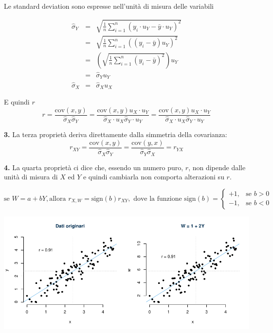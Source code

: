 \documentclass[
  11pt,
]{book}
\theoremstyle{mytheoremstyle}
\theoremstyle{mydefstyle}
\begin{document}
Le standard deviation sono espresse nell'unità di misura delle variabili

\begin{eqnarray*}
\hat\sigma_Y &=& \sqrt{\frac 1 n\sum_{i=1}^n{(y_i\cdot u_Y-\bar y\cdot u_Y)^2}}\\
  &=& \sqrt{\frac 1 n\sum_{i=1}^n{((y_i-\bar y)u_Y)^2}}\\
  &=& \left(\sqrt{\frac 1 n\sum_{i=1}^n{(y_i-\bar y)^2}}\right)u_Y\\
  &=& \hat\sigma_Y u_Y\\
\hat\sigma_X &=& \hat\sigma_X u_X
\end{eqnarray*}

E quindi \(r\)
\[r=\frac{\text{cov}(x,y)}{\hat\sigma_X\hat\sigma_Y}=\frac{\text{cov}(x,y)u_X\cdot u_Y}{\hat\sigma_X\cdot u_X\hat\sigma_Y\cdot u_Y}=
\frac{\text{cov}(x,y){u_X}\cdot u_Y}{\hat\sigma_X\cdot u_X\hat\sigma_Y\cdot u_Y}\]

\textbf{3.} La terza proprietà deriva direttamente dalla simmetria della covarianza:
\[r_{XY}=\frac{\text{cov}(x,y)}{\hat\sigma_X\hat\sigma_Y}=\frac{\text{cov}(y,x)}{\hat\sigma_Y\hat\sigma_X}=r_{YX}\]

\textbf{4.} La quarta proprietà ci dice che, essendo un numero puro, \(r\),
non dipende dalle unità di misura di \(X\) ed \(Y\) e quindi
cambiarla non comporta alterazioni su \(r\).

\[\text{se }W=a+bY,\text{allora }r_{X,W}=\text{sign}(b) r_{XY},\text{ dove la funzione sign}(b)=
\begin{cases}+1, &\text{se $b>0$}\\
             -1, &\text{se $b<0$}
\end{cases}\]

\begin{center}\includegraphics{Appunti_di_Statistica_2025_files/figure-latex/17-regressione-I-49-1} \end{center}
\end{document}
